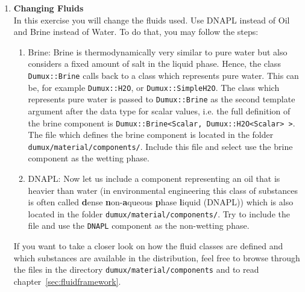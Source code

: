 \begin{enumerate}
\item \textbf{Changing Fluids} \\
  In this exercise you will change the fluids used. Use DNAPL instead
  of Oil and Brine instead of Water. To do that, you may follow the
  steps:
\begin{enumerate}
\item Brine: Brine is thermodynamically very similar to pure water but
  also considers a fixed amount of salt in the liquid phase.  Hence,
  the class \texttt{Dumux::Brine} calls back to a class which
  represents pure water. This can be, for example \texttt{Dumux::H2O},
  or \texttt{Dumux::SimpleH2O}.  The class which represents pure water
  is passed to \texttt{Dumux::Brine} as the second template argument
  after the data type for scalar values, i.e. the full definition of
  the brine component is \texttt{Dumux::Brine<Scalar,
    Dumux::H2O<Scalar> >}. The file which defines the brine component
  is located in the folder \texttt{dumux/material/components/}.  
  Include this file and select use the brine component as the wetting phase.
\item DNAPL: Now let us include a component representing an oil that
  is heavier than water (in environmental engineering this class of
  substances is often called \textbf{d}ense
  \textbf{n}on-\textbf{a}queous \textbf{p}hase \textbf{l}iquid
  (DNAPL)) which is also located in the folder
  \texttt{dumux/material/components/}. Try to include the file and
  use the \texttt{DNAPL} component as the non-wetting phase.
\end{enumerate}
If you want to take a closer look on how the fluid classes are defined
and which substances are available in the \eWoms distribution, feel
free to browse through the files in the directory
\texttt{dumux/material/components} and to read
chapter~\ref{sec:fluidframework}.


\end{enumerate}

